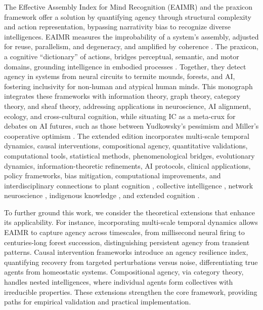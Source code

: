 \documentclass{article}
\begin{document}
The Effective Assembly Index for Mind Recognition (EAIMR) and the praxicon framework offer a solution by quantifying agency through structural complexity and action representation, bypassing narrativity bias to recognize diverse intelligences. EAIMR measures the improbability of a system’s assembly, adjusted for reuse, parallelism, and degeneracy, and amplified by coherence \citep{walker2013algorithmic}. The praxicon, a cognitive “dictionary” of actions, bridges perceptual, semantic, and motor domains, grounding intelligence in embodied processes \citep{pastra2011praxicon, peigneux2004imaging}. Together, they detect agency in systems from neural circuits to termite mounds, forests, and AI, fostering inclusivity for non-human and atypical human minds. This monograph integrates these frameworks with information theory, graph theory, category theory, and sheaf theory, addressing applications in neuroscience, AI alignment, ecology, and cross-cultural cognition, while situating IC as a meta-crux for debates on AI futures, such as those between Yudkowsky’s pessimism and Miller’s cooperative optimism \citep{yudkowsky2008artificial, miller2006robust}. The extended edition incorporates multi-scale temporal dynamics, causal interventions, compositional agency, quantitative validations, computational tools, statistical methods, phenomenological bridges, evolutionary dynamics, information-theoretic refinements, AI protocols, clinical applications, policy frameworks, bias mitigation, computational improvements, and interdisciplinary connections to plant cognition \citep{calvo2020plants}, collective intelligence \citep{camazine2001self}, network neuroscience \citep{bassett2017network}, indigenous knowledge \citep{kimmerer2013braiding}, and extended cognition \citep{clark2010supersizing}.

To further ground this work, we consider the theoretical extensions that enhance its applicability. For instance, incorporating multi-scale temporal dynamics allows EAIMR to capture agency across timescales, from millisecond neural firing to centuries-long forest succession, distinguishing persistent agency from transient patterns. Causal intervention frameworks introduce an agency resilience index, quantifying recovery from targeted perturbations versus noise, differentiating true agents from homeostatic systems. Compositional agency, via category theory, handles nested intelligences, where individual agents form collectives with irreducible properties. These extensions strengthen the core framework, providing paths for empirical validation and practical implementation.
\end{document}
